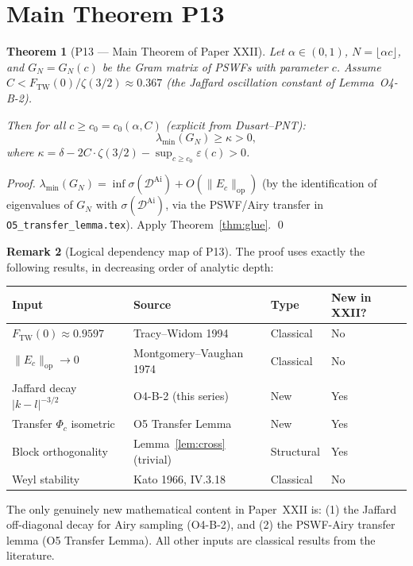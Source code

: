 \documentclass[12pt,a4paper]{amsart}
\newtheorem{theorem}{Theorem}[section]
\theoremstyle{definition}
\newtheorem{remark}[theorem]{Remark}
\newcommand{\DAi}{\mathcal{D}^{\mathrm{Ai}}}
\newcommand{\Ec}{E_c}
\newcommand{\norm}[1]{\|#1\|}
\begin{document}
\section{Main Theorem P13}
\label{sec:P13}

\begin{theorem}[P13 --- Main Theorem of Paper XXII]\label{thm:P13}
Let $\alpha \in (0,1)$, $N = \lfloor \alpha c \rfloor$,
and $G_N = G_N(c)$ be the Gram matrix of PSWFs with parameter $c$.
Assume $C < F_{\mathrm{TW}}(0)/\zeta(3/2) \approx 0.367$
(the Jaffard oscillation constant of Lemma~O4-B-2).

Then for all $c \ge c_0 = c_0(\alpha, C)$ (explicit from Dusart--PNT):
\begin{equation}\label{eq:P13final}
  \lambda_{\min}(G_N) \ge \kappa > 0,
\end{equation}
where $\kappa = \delta - 2C\cdot\zeta(3/2) - \sup_{c \ge c_0}\varepsilon(c) > 0$.
\end{theorem}

\begin{proof}
$\lambda_{\min}(G_N) = \inf\sigma(\DAi) + O(\norm{\Ec}_{\mathrm{op}})$
(by the identification of eigenvalues of $G_N$ with $\sigma(\DAi)$,
via the PSWF/Airy transfer in \texttt{O5\_transfer\_lemma.tex}).
Apply Theorem~\ref{thm:glue}. \qed
\end{proof}

\begin{remark}[Logical dependency map of P13]
The proof uses exactly the following results,
in decreasing order of analytic depth:

\begin{center}
\renewcommand{\arraystretch}{1.4}
\begin{tabular}{llll}
\toprule
\textbf{Input} & \textbf{Source} & \textbf{Type} & \textbf{New in XXII?} \\
\midrule
$F_{\mathrm{TW}}(0) \approx 0.9597$ & Tracy--Widom 1994 & Classical & No \\
$\norm{E_c}_{\mathrm{op}} \to 0$ & Montgomery--Vaughan 1974 & Classical & No \\
Jaffard decay $|k-l|^{-3/2}$ & O4-B-2 (this series) & New & Yes \\
Transfer $\Phi_c$ isometric & O5 Transfer Lemma & New & Yes \\
Block orthogonality & Lemma~\ref{lem:cross} (trivial) & Structural & Yes \\
Weyl stability & Kato 1966, IV.3.18 & Classical & No \\
\bottomrule
\end{tabular}
\end{center}

The only genuinely new mathematical content in Paper~XXII is:
(1) the Jaffard off-diagonal decay for Airy sampling (O4-B-2),
and (2) the PSWF-Airy transfer lemma (O5 Transfer Lemma).
All other inputs are classical results from the literature.
\end{remark}
\end{document}
